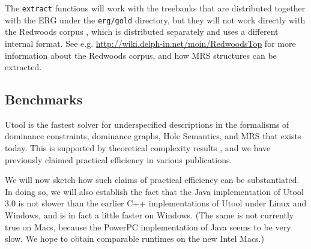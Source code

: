 The \verb?extract? functions will work with the treebanks that are
distributed together with the ERG under the \verb|erg/gold| directory,
but they will not work directly with the Redwoods corpus
\cite{Oepen&al:Redwoods}, which is distributed separately and uses a
 different internal format. See e.g.
\url{http://wiki.delph-in.net/moin/RedwoodsTop} for more information
about the Redwoods corpus, and how MRS structures can be extracted.




\subsection{Benchmarks}

Utool is the fastest solver for underspecified descriptions in the
formalisms of dominance constraints, dominance graphs, Hole Semantics,
and MRS that exists today. This is supported by theoretical complexity
results
\cite{Althaus-J.Algo.,bodirsky-weakly-normal-constraints,KolTha05b},
and we have previously claimed practical efficiency in various
publications.

We will now sketch how such claims of practical efficiency can be
substantiated. In doing so, we will also establish the fact that the
Java implementation of Utool 3.0 is not slower than the earlier C++
implementations of Utool under Linux and Windows, and is in fact a
little faster on Windows. (The same is not currently true on Macs,
because the PowerPC implementation of Java seems to be very slow. We
hope to obtain comparable runtimes on the new Intel Macs.)

